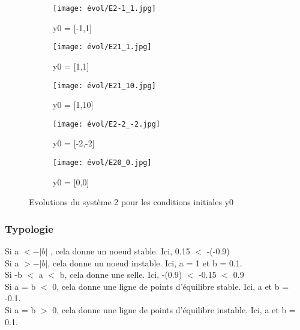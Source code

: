 \documentclass[utf8]{article}
\begin{document}
\begin{figure}[!htb]
\centering
\begin{subfigure}{.3\textwidth}
  \centering
  \texttt{[image: évol/E2-1\_1.jpg]}
  \caption{y0 = [-1,1]}
  \label{fig:sub1}
\end{subfigure}%
\begin{subfigure}{.3\textwidth}
  \centering
  \texttt{[image: évol/E21\_1.jpg]}
  \caption{y0 = [1,1]}
  \label{fig:sub2}
  \end{subfigure}
  \begin{subfigure}{.3\textwidth}
  \centering
  \texttt{[image: évol/E21\_10.jpg]}
  \caption{y0 = [1,10]}
  \end{subfigure}%
  \begin{subfigure}{.3\textwidth}
  \centering
  \texttt{[image: évol/E2-2\_-2.jpg]}
  \caption{y0 = [-2,-2]}
  \end{subfigure}
  \begin{subfigure}{.3\textwidth}
  \centering
  \texttt{[image: évol/E20\_0.jpg]}
  \caption{y0 = [0,0]}
  \end{subfigure}
\caption{Evolutions du système 2 pour les conditions initiales y0}
\end{figure}

\subsubsection{Typologie}

Si a $< -|b|$ , cela donne un noeud stable. Ici, 0.15 $<$ -(-0.9)
\\
Si a $ > -|b|$, cela donne un noeud instable. Ici, a = 1 et b = 0.1.
\\
Si -b $<$ a $<$ b, cela donne une selle. Ici, -(0.9) $<$ -0.15 $<$ 0.9
\\
Si a = b $<$ 0, cela donne une ligne de points d’équilibre stable. Ici, a et b = -0.1.
\\
Si a = b $>$ 0, cela donne une ligne de points d’équilibre instable. Ici, a et b = 0.1.
\end{document}

